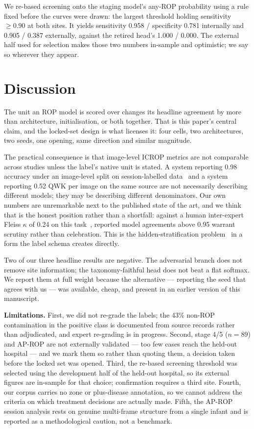 \documentclass{article}
\begin{document}
We re-based screening onto the staging model's any-ROP probability using a rule
fixed before the curves were drawn: the largest threshold holding sensitivity
$\geq 0.90$ at both sites. It yields sensitivity 0.958 / specificity 0.781
internally and 0.905 / 0.387 externally, against the retired head's 1.000 /
0.000. The external half used for selection makes those two numbers in-sample and
optimistic; we say so wherever they appear.

\section{Discussion}
\label{sec:discussion}

The unit an ROP model is scored over changes its headline agreement by more than
architecture, initialisation, or both together. That is this paper's central
claim, and the locked-set design is what licenses it: four cells, two
architectures, two seeds, one opening, same direction and similar magnitude.

The practical consequence is that image-level ICROP metrics are not comparable
across studies unless the label's native unit is stated. A system reporting 0.98
accuracy under an image-level split on session-labelled data~\cite{vahid2026} and
a system reporting 0.52 QWK per image on the same source are not necessarily
describing different models; they may be describing different denominators. Our
own numbers are unremarkable next to the published state of the art, and we think
that is the honest position rather than a shortfall: against a human inter-expert
Fleiss $\kappa$ of 0.24 on this task~\cite{gschliesser2015}, reported model
agreements above 0.95 warrant scrutiny rather than celebration. This is the
hidden-stratification problem~\cite{oakden2020} in a form the label schema
creates directly.

Two of our three headline results are negative. The adversarial branch does not
remove site information; the taxonomy-faithful head does not beat a flat softmax.
We report them at full weight because the alternative --- reporting the seed that
agrees with us --- was available, cheap, and present in an earlier version of
this manuscript.

\textbf{Limitations.} First, we did not re-grade the labels; the 43\% non-ROP
contamination in the positive class is documented from source records rather than
adjudicated, and expert re-grading is in progress. Second, stage 4/5 ($n=89$) and
AP-ROP are not externally validated --- too few cases reach the held-out hospital
--- and we mark them so rather than quoting them, a decision taken before the
locked set was opened. Third, the re-based screening threshold was selected using
the development half of the held-out hospital, so its external figures are
in-sample for that choice; confirmation requires a third site. Fourth, our corpus
carries no zone or plus-disease annotation, so we cannot address the criteria on
which treatment decisions are actually made. Fifth, the AP-ROP session analysis
rests on genuine multi-frame structure from a single infant and is reported as a
methodological caution, not a benchmark.
\end{document}
